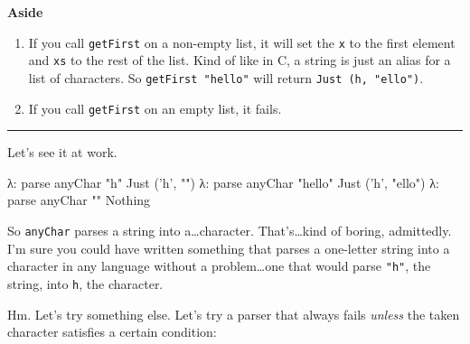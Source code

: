 \documentclass[]{article}
\newenvironment{Shaded}{}{}
\newcommand{\CharTok}[1]{\textcolor[rgb]{0.25,0.44,0.63}{#1}}
\newcommand{\DataTypeTok}[1]{\textcolor[rgb]{0.56,0.13,0.00}{#1}}
\newcommand{\FunctionTok}[1]{\textcolor[rgb]{0.02,0.16,0.49}{#1}}
\newcommand{\NormalTok}[1]{#1}
\newcommand{\StringTok}[1]{\textcolor[rgb]{0.25,0.44,0.63}{#1}}
\begin{document}
\textbf{Aside}

\begin{enumerate}
\def\labelenumi{\arabic{enumi}.}
\tightlist
\item
  If you call \texttt{getFirst} on a non-empty list, it will set the \texttt{x}
  to the first element and \texttt{xs} to the rest of the list. Kind of like in
  C, a string is just an alias for a list of characters. So
  \texttt{getFirst\ "hello"} will return
  \texttt{Just\ (\textquotesingle{}h\textquotesingle{},\ "ello")}.
\item
  If you call \texttt{getFirst} on an empty list, it fails.
\end{enumerate}

\begin{center}\rule{0.5\linewidth}{\linethickness}\end{center}

Let's see it at work.

\begin{Shaded}
\begin{Highlighting}[]
\NormalTok{λ}\FunctionTok{:}\NormalTok{ parse anyChar }\StringTok{"h"}
\DataTypeTok{Just}\NormalTok{ (}\CharTok{'h'}\NormalTok{, }\StringTok{""}\NormalTok{)}
\NormalTok{λ}\FunctionTok{:}\NormalTok{ parse anyChar }\StringTok{"hello"}
\DataTypeTok{Just}\NormalTok{ (}\CharTok{'h'}\NormalTok{, }\StringTok{"ello"}\NormalTok{)}
\NormalTok{λ}\FunctionTok{:}\NormalTok{ parse anyChar }\StringTok{""}
\DataTypeTok{Nothing}
\end{Highlighting}
\end{Shaded}

So \texttt{anyChar} parses a string into a\ldots{}character. That's\ldots{}kind
of boring, admittedly. I'm sure you could have written something that parses a
one-letter string into a character in any language without a problem\ldots{}one
that would parse \texttt{"h"}, the string, into
\texttt{\textquotesingle{}h\textquotesingle{}}, the character.

Hm. Let's try something else. Let's try a parser that always fails \emph{unless}
the taken character satisfies a certain condition:
\end{document}
